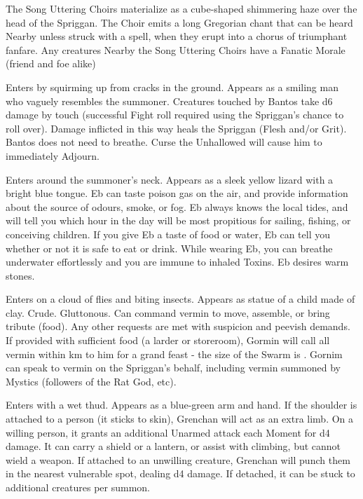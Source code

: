{
The Song Uttering Choirs materialize as a cube-shaped shimmering haze over the head of the Spriggan.  The Choir emits a long Gregorian chant that can be heard Nearby unless struck with a spell, when they erupt into a chorus of triumphant fanfare.  Any creatures Nearby the Song Uttering Choirs have a Fanatic Morale (friend and foe alike)



Enters by squirming up from cracks in the ground. Appears as a smiling man who vaguely resembles the summoner. Creatures touched by Bantos take d6 damage by touch (successful Fight roll required using the Spriggan's chance to roll over). Damage inflicted in this way heals the Spriggan (Flesh and/or Grit).  Bantos does not need to breathe.  Curse the Unhallowed will cause him to immediately Adjourn. 

Enters around the summoner's neck. Appears as a sleek yellow lizard with a bright blue tongue. Eb can taste poison gas on the air, and provide information about the source of odours, smoke, or fog. Eb always knows the local tides, and will tell you which hour in the day will be most propitious for sailing, fishing, or conceiving children. If you give Eb a taste of food or water, Eb can tell you whether or not it is safe to eat or drink.  While wearing Eb, you can breathe underwater effortlessly and you are immune to inhaled Toxins.  Eb desires warm stones.


Enters on a cloud of flies and biting insects. Appears as statue of a child made of clay. Crude. Gluttonous. Can command vermin to move, assemble, or bring tribute (food). Any other requests are met with suspicion and peevish demands. If provided with sufficient food (a larder or storeroom), Gormin will call all vermin within \DICE km to him for a grand feast - the size of the Swarm is \DICE \HD.  Gornim can speak to vermin on the Spriggan's behalf, including vermin summoned by Mystics (followers of the Rat God, etc).  


Enters with a wet thud. Appears as a blue-green arm and hand. If the shoulder is attached to a person (it sticks to skin), Grenchan will act as an extra limb. On a willing person, it grants an additional Unarmed attack each Moment for d4 damage. It can carry a shield or a lantern, or assist with climbing, but cannot wield a weapon.  If attached to an unwilling creature, Grenchan will punch them in the nearest vulnerable spot, dealing d4 damage. If detached, it can be stuck to \DICE additional creatures per summon. 



}

